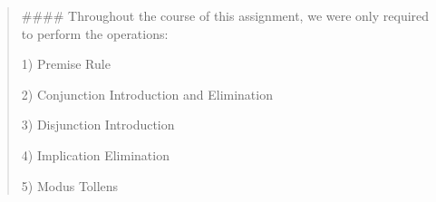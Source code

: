 \begin{quote}
\#\#\#\# Throughout the course of this assignment, we were only required to perform the operations\+:


\begin{DoxyItemize}
\item 1) Premise Rule
\item 2) Conjunction Introduction and Elimination
\item 3) Disjunction Introduction
\item 4) Implication Elimination
\item 5) Modus Tollens
\end{DoxyItemize}

\end{quote}
~\newline
~\newline


